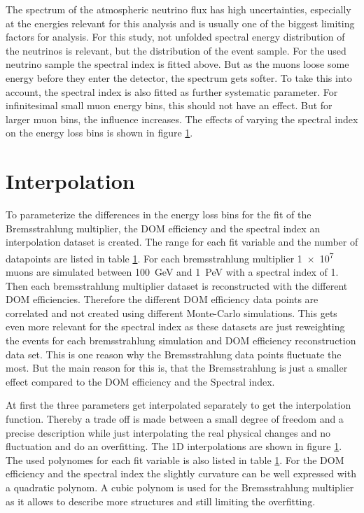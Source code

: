 The spectrum of the atmospheric neutrino flux has high uncertainties, especially at the energies relevant for this analysis and is usually one of the biggest limiting factors for analysis.
For this study, not unfolded spectral energy distribution of the neutrinos is relevant, but the distribution of the event sample.
For the used neutrino sample the spectral index is fitted above.
But as the muons loose some energy before they enter the detector, the spectrum gets softer.
To take this into account, the spectral index is also fitted as further systematic parameter.
For infinitesimal small muon energy bins, this should not have an effect.
But for larger muon bins, the influence increases.
The effects of varying the spectral index on the energy loss bins is shown in figure \ref{}.

\section{Interpolation}

To parameterize the differences in the energy loss bins for the fit of the Bremsstrahlung multiplier, the DOM efficiency and the spectral index an interpolation dataset is created.
The range for each fit variable and the number of datapoints are listed in table \ref{}.
For each bremsstrahlung multiplier \num{1e7} muons are simulated between \SI{100}{GeV} and \SI{1}{PeV} with a spectral index of \num{1}.
Then each bremsstrahlung multiplier dataset is reconstructed with the different DOM efficiencies.
Therefore the different DOM efficiency data points are correlated and not created using different Monte-Carlo simulations.
This gets even more relevant for the spectral index as these datasets are just reweighting the events for each bremsstrahlung simulation and DOM efficiency reconstruction data set.
This is one reason why the Bremsstrahlung data points fluctuate the most.
But the main reason for this is, that the Bremsstrahlung is just a smaller effect compared to the DOM efficiency and the Spectral index.

At first the three parameters get interpolated separately to get the interpolation function.
Thereby a trade off is made between a small degree of freedom and a precise description while just interpolating the real physical changes and no fluctuation and do an overfitting.
The 1D interpolations are shown in figure \ref{}.
The used polynomes for each fit variable is also listed in table \ref{}.
For the DOM efficiency and the spectral index the slightly curvature can be well expressed with a quadratic polynom.
A cubic polynom is used for the Bremsstrahlung multiplier as it allows to describe more structures and still limiting the overfitting.

